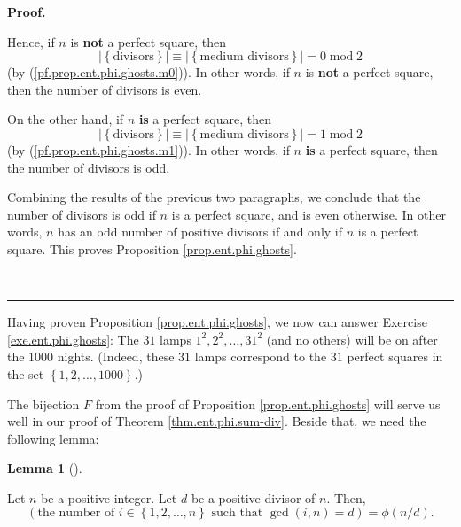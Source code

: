 \documentclass[numbers=enddot,12pt,final,onecolumn,notitlepage]{scrartcl}%
\numberwithin{exer}{subsection}
\theoremstyle{definition}
\newtheorem{lem}[theo]{Lemma}
\newenvironment{lemma}[1][]
{\begin{lem}[#1]\begin{leftbar}}
{\end{leftbar}\end{lem}}
\newenvironment{fineprint}{\begin{small}}{\end{small}}
\newenvironment{proof}[1][Proof]{\noindent\textbf{#1.} }{\ \rule{0.5em}{0.5em}}
\begin{document}
\begin{proof}
\begin{fineprint}
Hence, if $n$ is \textbf{not} a perfect square, then%
\[
\left\vert \left\{  \text{divisors}\right\}  \right\vert \equiv\left\vert
\left\{  \text{medium divisors}\right\}  \right\vert =0\operatorname{mod}2
\]
(by (\ref{pf.prop.ent.phi.ghosts.m0})). In other words, if $n$ is \textbf{not}
a perfect square, then the number of divisors is even.

On the other hand, if $n$ \textbf{is} a perfect square, then%
\[
\left\vert \left\{  \text{divisors}\right\}  \right\vert \equiv\left\vert
\left\{  \text{medium divisors}\right\}  \right\vert =1\operatorname{mod}2
\]
(by (\ref{pf.prop.ent.phi.ghosts.m1})). In other words, if $n$ \textbf{is} a
perfect square, then the number of divisors is odd.

Combining the results of the previous two paragraphs, we conclude that the
number of divisors is odd if $n$ is a perfect square, and is even otherwise.
In other words, $n$ has an odd number of positive divisors if and only if $n$
is a perfect square. This proves Proposition \ref{prop.ent.phi.ghosts}.
\end{fineprint}
\end{proof}

Having proven Proposition \ref{prop.ent.phi.ghosts}, we now can answer
Exercise \ref{exe.ent.phi.ghosts}: The $31$ lamps $1^{2},2^{2},\ldots,31^{2}$
(and no others) will be on after the $1000$ nights. (Indeed, these $31$ lamps
correspond to the $31$ perfect squares in the set $\left\{  1,2,\ldots
,1000\right\}  $.)

The bijection $F$ from the proof of Proposition \ref{prop.ent.phi.ghosts} will
serve us well in our proof of Theorem \ref{thm.ent.phi.sum-div}. Beside that,
we need the following lemma:

\begin{lemma}
\label{lem.ent.phi.sum-div.n/d}Let $n$ be a positive integer. Let $d$ be a
positive divisor of $n$. Then,%
\[
\left(  \text{the number of }i\in\left\{  1,2,\ldots,n\right\}  \text{ such
that }\gcd\left(  i,n\right)  =d\right)  =\phi\left(  n/d\right)  .
\]

\end{lemma}
\end{document}
